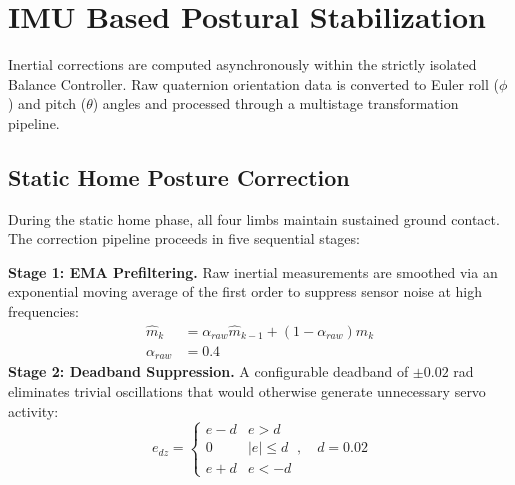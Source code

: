 \section{IMU Based Postural Stabilization}

Inertial corrections are computed asynchronously within the
strictly isolated Balance Controller. Raw quaternion orientation
data is converted to Euler roll ($\phi$) and pitch ($\theta$)
angles \cite{madgwick2011estimation} and processed through a
multistage transformation pipeline.

\subsection{Static Home Posture Correction}

During the static home phase, all four limbs maintain sustained
ground contact. The correction pipeline proceeds in five
sequential stages:

\textbf{Stage 1: EMA Prefiltering.}
Raw inertial measurements are smoothed via an exponential moving
average of the first order to suppress
sensor noise at high frequencies:
\begin{align}
    \hat{m}_k &= \alpha_{raw} \hat{m}_{k-1}
    + (1 - \alpha_{raw}) m_k \nonumber\\
    \alpha_{raw} &= 0.4
\end{align}
\textbf{Stage 2: Deadband Suppression.}
A configurable deadband of $\pm 0.02$ rad eliminates trivial
oscillations that would otherwise generate unnecessary servo
activity:
\begin{equation}
    e_{dz} =
    \begin{cases}
      e - d & e > d \\
      0 & |e| \leq d \\
      e + d & e < -d
    \end{cases}
    , \quad d = 0.02
\end{equation}

